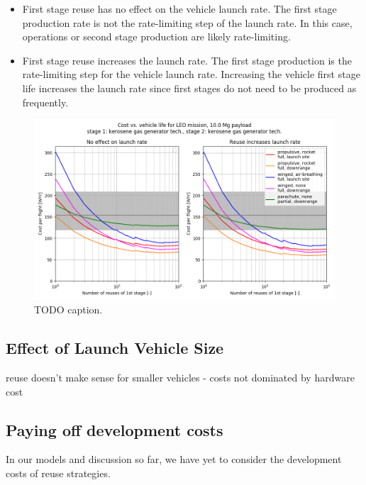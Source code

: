 \documentclass[conf]{new-aiaa}
\begin{document}
\begin{itemize}
  \item First stage reuse has no effect on the vehicle launch rate. The first stage production rate is not the rate-limiting step of the launch rate. In this case, operations or second stage production are likely rate-limiting.
  \item First stage reuse increases the launch rate. The first stage production is the rate-limiting step for the vehicle launch rate. Increasing the vehicle first stage life increases the launch rate since first stages do not need to be produced as frequently.
\end{itemize}

\begin{figure}[hbt!]
    \centering
    \includegraphics[width=\textwidth]{../../lvreuse/analysis/combined/plots/num_reuse_sweep_LEO_kerosene}
    \caption{\label{fig:num_reuse_sweep_LEO_kerosene} TODO caption.}
\end{figure}



\subsection{Effect of Launch Vehicle Size}
reuse doesn't make sense for smaller vehicles - costs not dominated by hardware cost

\subsection{Paying off development costs}

In our models and discussion so far, we have yet to consider the development costs of reuse strategies. 
\end{document}
